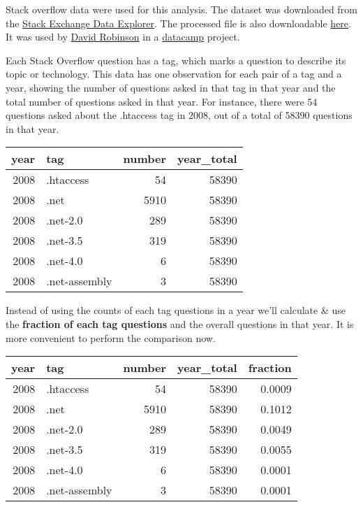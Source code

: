 \documentclass[
]{article}
\begin{document}
Stack overflow data were used for this analysis. The dataset was
downloaded from the \href{https://data.stackexchange.com/}{Stack
Exchange Data Explorer}. The processed file is also downloadable
\href{https://gist.github.com/dgrtwo/a30d99baa9b7bfc9f2440b355ddd1f75}{here}.
It was used by \href{https://twitter.com/drob}{David Robinson} in a
\href{https://www.datacamp.com/}{datacamp} project.

Each Stack Overflow question has a tag, which marks a question to
describe its topic or technology. This data has one observation for each
pair of a tag and a year, showing the number of questions asked in that
tag in that year and the total number of questions asked in that year.
For instance, there were 54 questions asked about the .htaccess tag in
2008, out of a total of 58390 questions in that year.

\begin{table}
\centering
\begin{tabular}{r|l|r|r}
\hline
year & tag & number & year\_total\\
\hline
2008 & .htaccess & 54 & 58390\\
\hline
2008 & .net & 5910 & 58390\\
\hline
2008 & .net-2.0 & 289 & 58390\\
\hline
2008 & .net-3.5 & 319 & 58390\\
\hline
2008 & .net-4.0 & 6 & 58390\\
\hline
2008 & .net-assembly & 3 & 58390\\
\hline
\end{tabular}
\end{table}

Instead of using the counts of each tag questions in a year we'll
calculate \& use the \textbf{fraction of each tag questions} and the
overall questions in that year. It is more convenient to perform the
comparison now.

\begin{table}
\centering
\begin{tabular}{r|l|r|r|r}
\hline
year & tag & number & year\_total & fraction\\
\hline
2008 & .htaccess & 54 & 58390 & 0.0009\\
\hline
2008 & .net & 5910 & 58390 & 0.1012\\
\hline
2008 & .net-2.0 & 289 & 58390 & 0.0049\\
\hline
2008 & .net-3.5 & 319 & 58390 & 0.0055\\
\hline
2008 & .net-4.0 & 6 & 58390 & 0.0001\\
\hline
2008 & .net-assembly & 3 & 58390 & 0.0001\\
\hline
\end{tabular}
\end{table}
\end{document}
